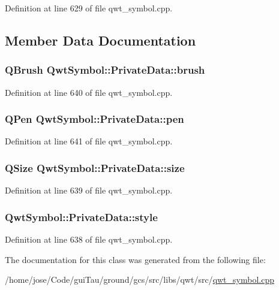 Definition at line 629 of file qwt\-\_\-symbol.\-cpp.



\subsection{Member Data Documentation}
\hypertarget{class_qwt_symbol_1_1_private_data_a1fa2f083307d8af8be20946554b48963}{
\subsubsection[{brush}]{\setlength{\rightskip}{0pt plus 5cm}Q\-Brush Qwt\-Symbol\-::\-Private\-Data\-::brush}}\label{class_qwt_symbol_1_1_private_data_a1fa2f083307d8af8be20946554b48963}


Definition at line 640 of file qwt\-\_\-symbol.\-cpp.

\hypertarget{class_qwt_symbol_1_1_private_data_a29e88fd81f4cc5ccca817c0e98d14725}{
\subsubsection[{pen}]{\setlength{\rightskip}{0pt plus 5cm}Q\-Pen Qwt\-Symbol\-::\-Private\-Data\-::pen}}\label{class_qwt_symbol_1_1_private_data_a29e88fd81f4cc5ccca817c0e98d14725}


Definition at line 641 of file qwt\-\_\-symbol.\-cpp.

\hypertarget{class_qwt_symbol_1_1_private_data_aba579dda8a092028376bb3aa2baa61c0}{
\subsubsection[{size}]{\setlength{\rightskip}{0pt plus 5cm}Q\-Size Qwt\-Symbol\-::\-Private\-Data\-::size}}\label{class_qwt_symbol_1_1_private_data_aba579dda8a092028376bb3aa2baa61c0}


Definition at line 639 of file qwt\-\_\-symbol.\-cpp.

\hypertarget{class_qwt_symbol_1_1_private_data_ad1bbeea774e4abe80b7e4c7d050da2ff}{
\subsubsection[{style}]{ Qwt\-Symbol\-::\-Private\-Data\-::style}}\label{class_qwt_symbol_1_1_private_data_ad1bbeea774e4abe80b7e4c7d050da2ff}


Definition at line 638 of file qwt\-\_\-symbol.\-cpp.



The documentation for this class was generated from the following file\-:\begin{DoxyCompactItemize}
\item 
/home/jose/\-Code/gui\-Tau/ground/gcs/src/libs/qwt/src/\hyperlink{qwt__symbol_8cpp}{qwt\-\_\-symbol.\-cpp}\end{DoxyCompactItemize}
